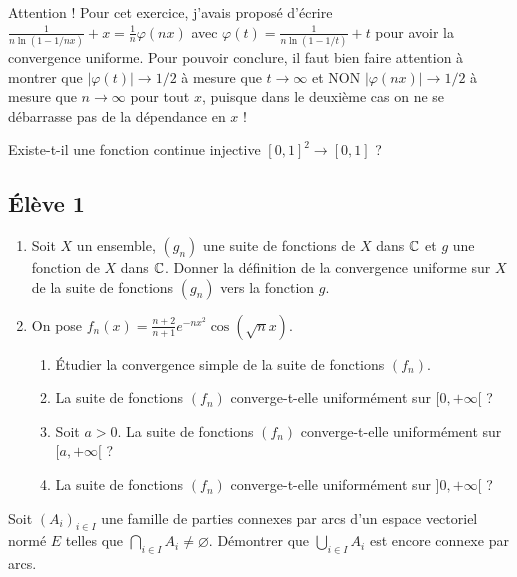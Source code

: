 \documentclass[10pt]{scrartcl}
\begin{document}
    \begin{remarks}
        Attention ! Pour cet exercice, j'avais proposé d'écrire $\frac1{n\ln(1-1/nx)}+x=\frac1n\varphi(nx)$ avec $\varphi(t)=\frac1{n\ln(1-1/t)}+t$ pour avoir la convergence uniforme. 
        Pour pouvoir conclure, il faut bien faire attention à montrer que $|\varphi(t)|\to 1/2$ à mesure que $t\to\infty$ et NON $|\varphi(nx)|\to 1/2$ à mesure que $n\to\infty$ pour tout $x$, puisque dans le deuxième cas on ne se débarrasse pas de la dépendance en $x$ !
    \end{remarks}

    \begin{exo}
        Existe-t-il une fonction continue injective $[0,1]^2\to[0,1]$ ?
    \end{exo}

    \subsection*{Élève 1}

    \begin{ccp}\hfill
        \begin{enumerate}
            \item Soit $X$ un ensemble, $(g_n)$ une suite de fonctions de $X$ dans $\operatorname{\mathbb C}$ et $g$ une fonction de $X$ dans $\operatorname{\mathbb C}$. 
            Donner la définition de la convergence uniforme sur $X$ de la suite de fonctions $(g_n)$ vers la fonction $g$. 

            \item On pose $f_n(x)=\frac{n+2}{n+1}e^{-nx^2}\cos(\sqrt{n}x)$.
            \begin{enumerate}
                \item Étudier la convergence simple de la suite de fonctions $(f_n)$.
                \item La suite de fonctions $(f_n)$ converge-t-elle uniformément sur $[0,+\infty[$ ?
                \item Soit $a>0$. La suite de fonctions $(f_n)$ converge-t-elle uniformément sur $[a,+\infty[$ ?
                \item La suite de fonctions $(f_n)$ converge-t-elle uniformément sur $]0,+\infty[$ ?
            \end{enumerate}
        \end{enumerate}
    \end{ccp}

    \begin{exo}
        Soit $(A_i)_{i\in I}$ une famille de parties connexes par arcs d'un espace vectoriel normé $E$ telles que $\bigcap_{i\in I}A_i\neq \varnothing$. 
        Démontrer que $\bigcup_{i\in I} A_i$ est encore connexe par arcs.
    \end{exo}
\end{document}

